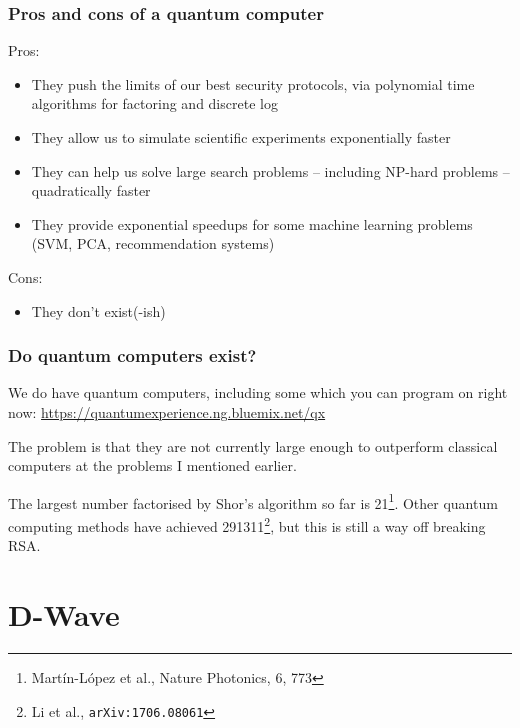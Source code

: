 \documentclass[]{beamer}
\begin{document}
\begin{frame}[noframenumbering]
\frametitle{Pros and cons of a quantum computer}

Pros:
\begin{itemize}
\item They push the limits of our best security protocols, via polynomial time algorithms for factoring and discrete log
\item They allow us to simulate scientific experiments exponentially faster
\item They can help us solve large search problems -- including NP-hard problems -- quadratically faster
\item They provide exponential speedups for some machine learning problems (SVM, PCA, recommendation systems)
\end{itemize}

Cons:
\begin{itemize}
\item They don't exist(-ish)
\end{itemize}
\end{frame}

\begin{frame}
\frametitle{Do quantum computers exist?}

We do have quantum computers, including some which you can program on right now: \url{https://quantumexperience.ng.bluemix.net/qx}

The problem is that they are not currently large enough to outperform classical computers at the problems I mentioned earlier.

The largest number factorised by Shor's algorithm so far is 21\footnote{Martín-López et al., Nature Photonics, 6, 773}. Other quantum computing methods have achieved 291311\footnote{Li et al., {\tt arXiv:1706.08061}}, but this is still a way off breaking RSA.
\end{frame}

\section{D-Wave}
\end{document}
